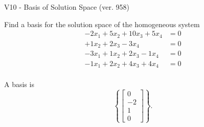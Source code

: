 \begin{exercise}
  \begin{exerciseTitle}V10 - Basis of Solution Space (ver. 958)\end{exerciseTitle}
  \begin{exerciseStatement}
    Find a basis for the solution space of the homogeneous system 
\begin{align*}
 -2 x_ 1 + 5 x_ 2 + 10 x_ 3 + 5 x_ 4 &= 0  \\ 
  + 1 x_ 2 + 2 x_ 3 -3 x_ 4 &= 0  \\ 
  -3 x_ 1 + 1 x_ 2 + 2 x_ 3 -1 x_ 4 &= 0  \\ 
  -1 x_ 1 + 2 x_ 2 + 4 x_ 3 + 4 x_ 4 &= 0  \\ 
 \end{align*}


 
  \end{exerciseStatement}

  \begin{exerciseAnswer}
   A basis is   
\[\left\{\left[\begin{array}{c}
0 \\
-2 \\
1 \\
0
\end{array}\right]\right\}.\]

  


  \end{exerciseAnswer}
\end{exercise}